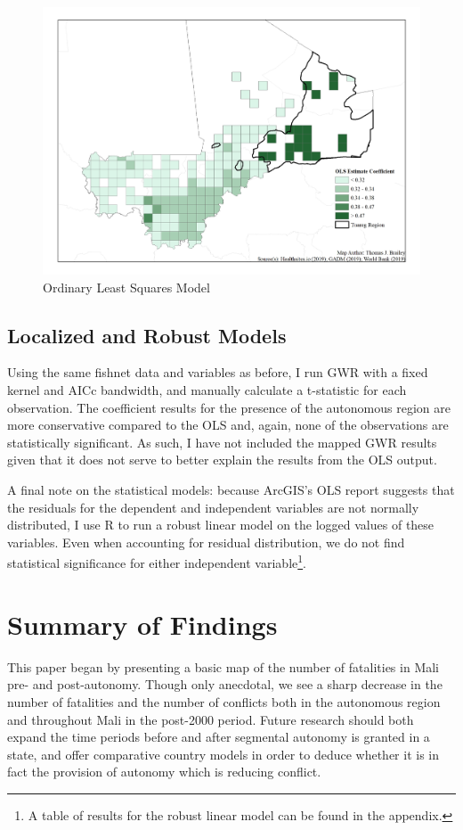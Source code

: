 \documentclass[12pt]{article}
\begin{document}
\begin{figure}[ht]
\centering\includegraphics[width=\textwidth,height=\textheight,keepaspectratio]{tjbrailey_final_project_map_health_ols.jpg}
\caption{Ordinary Least Squares Model}
\end{figure}

\subsection{Localized and Robust Models}
Using the same fishnet data and variables as before, I run GWR with a fixed kernel and AICc bandwidth, and manually calculate a t-statistic for each observation. The coefficient results for the presence of the autonomous region are more conservative compared to the OLS and, again, none of the observations are statistically significant.  As such, I have not included the mapped GWR results given that it does not serve to better explain the results from the OLS output. 

A final note on the statistical models: because ArcGIS's OLS report suggests that the residuals for the dependent and independent variables are not normally distributed, I use R to run a robust linear model on the logged values of these variables. Even when accounting for residual distribution, we do not find statistical significance for either independent variable\footnote{A table of results for the robust linear model can be found in the appendix.}.  

\section{Summary of Findings}
This paper began by presenting a basic map of the number of fatalities in Mali pre- and post-autonomy. Though only anecdotal, we see a sharp decrease in the number of fatalities and the number of conflicts both in the autonomous region and throughout Mali in the post-2000 period. Future research should both expand the time periods before and after segmental autonomy is granted in a state, and offer comparative country models in order to deduce whether it is in fact the provision of autonomy which is reducing conflict. 
\end{document}
